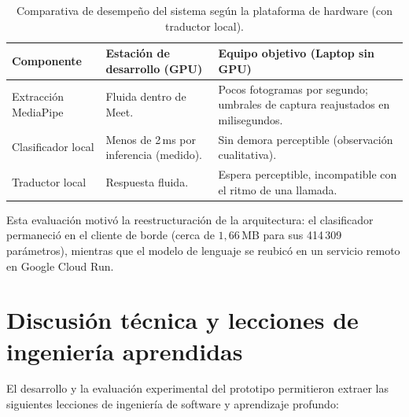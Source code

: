 \begin{table}[H]
    \centering
    \small
    \caption{Comparativa de desempeño del sistema según la plataforma de hardware (con traductor local).}
    \label{tab:hw_comparacion}
    \begin{tabularx}{\textwidth}{@{}>{\raggedright\arraybackslash}p{} >{\raggedright\arraybackslash}X >{\raggedright\arraybackslash}X@{}}
        \toprule
        \textbf{Componente} & \textbf{Estación de desarrollo (GPU)} & \textbf{Equipo objetivo (Laptop sin GPU)} \\
        \midrule
        Extracción MediaPipe & Fluida dentro de Meet. & Pocos fotogramas por segundo; umbrales de captura reajustados en milisegundos. \\
        Clasificador local & Menos de 2\,ms por inferencia (medido). & Sin demora perceptible (observación cualitativa). \\
        Traductor local & Respuesta fluida. & Espera perceptible, incompatible con el ritmo de una llamada. \\
        \bottomrule
    \end{tabularx}
\end{table}

Esta evaluación motivó la reestructuración de la arquitectura: el clasificador permaneció en el cliente de borde (cerca de $1{,}66$\,MB para sus 414\,309 parámetros), mientras que el modelo de lenguaje se reubicó en un servicio remoto en Google Cloud Run.

\section{Discusión técnica y lecciones de ingeniería aprendidas}

El desarrollo y la evaluación experimental del prototipo permitieron extraer las siguientes lecciones de ingeniería de software y aprendizaje profundo:

